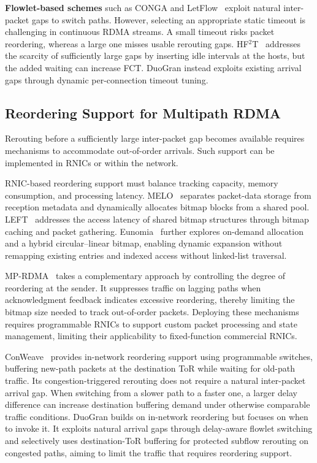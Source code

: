 \documentclass[10pt,journal,compsoc]{IEEEtran}
\begin{document}
\noindent
\textbf{Flowlet-based schemes} such as CONGA and LetFlow~\cite{Conga, Letflow} exploit natural inter-packet gaps to switch paths. However, selecting an appropriate static timeout is challenging in continuous RDMA streams. A small timeout risks packet reordering, whereas a large one misses usable rerouting gaps. HF$^2$T~\cite{HF2T} addresses the scarcity of sufficiently large gaps by inserting idle intervals at the hosts, but the added waiting can increase FCT. DuoGran instead exploits existing arrival gaps through dynamic per-connection timeout tuning.

\subsection{Reordering Support for Multipath RDMA}
\label{sec:related_reordering}

Rerouting before a sufficiently large inter-packet gap becomes available requires mechanisms to accommodate out-of-order arrivals. Such support can be implemented in RNICs or within the network.

\noindent
RNIC-based reordering support must balance tracking capacity, memory consumption, and processing latency. MELO~\cite{MELO} separates packet-data storage from reception metadata and dynamically allocates bitmap blocks from a shared pool. LEFT~\cite{LEFT} addresses the access latency of shared bitmap structures through bitmap caching and packet gathering. Eunomia~\cite{Eunomia} further explores on-demand allocation and a hybrid circular--linear bitmap, enabling dynamic expansion without remapping existing entries and indexed access without linked-list traversal.

MP-RDMA~\cite{MPRDMA} takes a complementary approach by controlling the degree of reordering at the sender. It suppresses traffic on lagging paths when acknowledgment feedback indicates excessive reordering, thereby limiting the bitmap size needed to track out-of-order packets. Deploying these mechanisms requires programmable RNICs to support custom packet processing and state management, limiting their applicability to fixed-function commercial RNICs.

ConWeave~\cite{Conweave} provides in-network reordering support using programmable switches, buffering new-path packets at the destination ToR while waiting for old-path traffic. Its congestion-triggered rerouting does not require a natural inter-packet arrival gap. When switching from a slower path to a faster one, a larger delay difference can increase destination buffering demand under otherwise comparable traffic conditions. DuoGran builds on in-network reordering but focuses on when to invoke it. It exploits natural arrival gaps through delay-aware flowlet switching and selectively uses destination-ToR buffering for protected subflow rerouting on congested paths, aiming to limit the traffic that requires reordering support.
\end{document}
